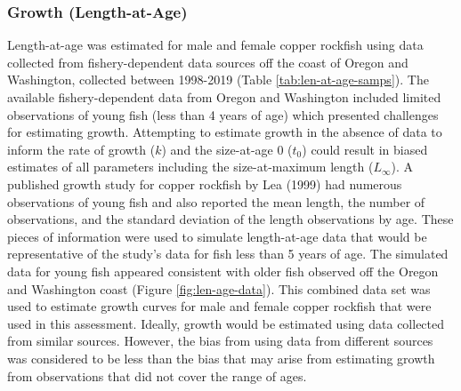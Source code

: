 \documentclass[11pt,
  english,
  a4paper,
]{article}
\begin{document}
\leavevmode\tagmcend\tagstructend\par


\hypertarget{growth-length-at-age}{%
\subsubsection{Growth (Length-at-Age)}\label{growth-length-at-age}}

\leavevmode\tagmcend\tagstructend


Length-at-age was estimated for male and female copper rockfish using data collected from fishery-dependent data sources off the coast of Oregon and Washington, collected between 1998-2019 (Table \ref{tab:len-at-age-samps}). The available fishery-dependent data from Oregon and Washington included limited observations of young fish (less than 4 years of age) which presented challenges for estimating growth. Attempting to estimate growth in the absence of data to inform the rate of growth ({\(k\)\leavevmode\tagmcend\tagstructend}) and the size-at-age 0 ({\(t_0\)\leavevmode\tagmcend\tagstructend}) could result in biased estimates of all parameters including the size-at-maximum length ({\(L_{\infty}\)\leavevmode\tagmcend\tagstructend}). A published growth study for copper rockfish by Lea {(1999)\leavevmode\tagmcend\tagstructend} had numerous observations of young fish and also reported the mean length, the number of observations, and the standard deviation of the length observations by age. These pieces of information were used to simulate length-at-age data that would be representative of the study's data for fish less than 5 years of age. The simulated data for young fish appeared consistent with older fish observed off the Oregon and Washington coast (Figure \ref{fig:len-age-data}). This combined data set was used to estimate growth curves for male and female copper rockfish that were used in this assessment. Ideally, growth would be estimated using data collected from similar sources. However, the bias from using data from different sources was considered to be less than the bias that may arise from estimating growth from observations that did not cover the range of ages.
\end{document}
